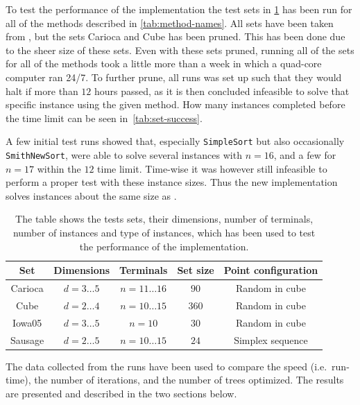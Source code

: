 To test the performance of the implementation the test sets in
\cref{tab:test-sets} has been run for all of the methods described in
\cref{tab:method-names}. All sets have been taken from \textcite{fonseca2014},
but the sets Carioca and Cube has been pruned. This has been done due to the
sheer size of these sets. Even with these sets pruned, running all of the sets
for all of the methods took a little more than a week in which a quad-core
computer ran 24/7. To further prune, all runs was set up such that they would
halt if more than $12$ hours passed, as it is then concluded infeasible to solve
that specific instance using the given method. How many instances completed
before the time limit can be seen in~\cref{tab:set-success}.

A few initial test runs showed that, especially \texttt{SimpleSort} but also
occasionally \texttt{SmithNewSort}, were able to solve several instances with
$n=16$, and a few for $n=17$ within the $12$ time limit. Time-wise it was
however still infeasible to perform a proper test with these instance sizes.
Thus the new implementation solves instances about the same size as
\textcite{fonseca2014}.

\begin{table}[htbp]
  \centering
  \begin{tabular}{ccccc}
    \toprule
    Set     & Dimensions       & Terminals             & Set size & Point configuration \\
    \midrule
    Carioca & $d = 3 \ldots 5$ & $n = 11 \ldots 16$    & $90$     & Random in cube      \\
    Cube    & $d = 2 \ldots 4$ & $n = 10 \ldots 15$    & $360$    & Random in cube      \\
    Iowa05  & $d = 3 \ldots 5$ & $n = 10$              & $30$     & Random in cube      \\
    Sausage & $d = 2 \ldots 5$ & $n = 10 \ldots 15$    & $24$     & Simplex sequence    \\
    \bottomrule
  \end{tabular}
  \caption[Test sets used to test performance]{The table shows the tests sets,
    their dimensions, number of terminals, number of instances and type of instances,
    which has been used to test the performance of the implementation.\label{tab:test-sets}}
\end{table}

The data collected from the runs have been used to compare the speed (i.e.\
run-time), the number of iterations, and the number of trees optimized. The
results are presented and described in the two sections below.

